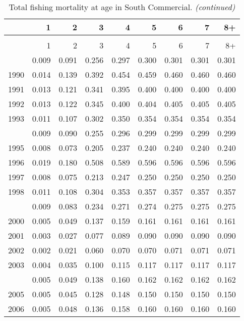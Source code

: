 \documentclass[
]{article}
\begin{document}
\begin{longtable}[t]{lrrrrrrrr}
\caption{\label{tab:South_Commercial-fleet-FAA-table}Total fishing mortality at age in South Commercial.}\\
\toprule
  & 1 & 2 & 3 & 4 & 5 & 6 & 7 & 8+\\
\midrule
\endfirsthead
\caption[]{Total fishing mortality at age in South Commercial. \textit{(continued)}}\\
\toprule
  & 1 & 2 & 3 & 4 & 5 & 6 & 7 & 8+\\
\midrule
\endhead

\endfoot
\bottomrule
\endlastfoot
1989 & 0.009 & 0.091 & 0.256 & 0.297 & 0.300 & 0.301 & 0.301 & 0.301\\
1990 & 0.014 & 0.139 & 0.392 & 0.454 & 0.459 & 0.460 & 0.460 & 0.460\\
1991 & 0.013 & 0.121 & 0.341 & 0.395 & 0.400 & 0.400 & 0.400 & 0.400\\
1992 & 0.013 & 0.122 & 0.345 & 0.400 & 0.404 & 0.405 & 0.405 & 0.405\\
1993 & 0.011 & 0.107 & 0.302 & 0.350 & 0.354 & 0.354 & 0.354 & 0.354\\
\addlinespace
1994 & 0.009 & 0.090 & 0.255 & 0.296 & 0.299 & 0.299 & 0.299 & 0.299\\
1995 & 0.008 & 0.073 & 0.205 & 0.237 & 0.240 & 0.240 & 0.240 & 0.240\\
1996 & 0.019 & 0.180 & 0.508 & 0.589 & 0.596 & 0.596 & 0.596 & 0.596\\
1997 & 0.008 & 0.075 & 0.213 & 0.247 & 0.250 & 0.250 & 0.250 & 0.250\\
1998 & 0.011 & 0.108 & 0.304 & 0.353 & 0.357 & 0.357 & 0.357 & 0.357\\
\addlinespace
1999 & 0.009 & 0.083 & 0.234 & 0.271 & 0.274 & 0.275 & 0.275 & 0.275\\
2000 & 0.005 & 0.049 & 0.137 & 0.159 & 0.161 & 0.161 & 0.161 & 0.161\\
2001 & 0.003 & 0.027 & 0.077 & 0.089 & 0.090 & 0.090 & 0.090 & 0.090\\
2002 & 0.002 & 0.021 & 0.060 & 0.070 & 0.070 & 0.071 & 0.071 & 0.071\\
2003 & 0.004 & 0.035 & 0.100 & 0.115 & 0.117 & 0.117 & 0.117 & 0.117\\
\addlinespace
2004 & 0.005 & 0.049 & 0.138 & 0.160 & 0.162 & 0.162 & 0.162 & 0.162\\
2005 & 0.005 & 0.045 & 0.128 & 0.148 & 0.150 & 0.150 & 0.150 & 0.150\\
2006 & 0.005 & 0.048 & 0.136 & 0.158 & 0.160 & 0.160 & 0.160 & 0.160\\

\end{longtable}
\end{document}
